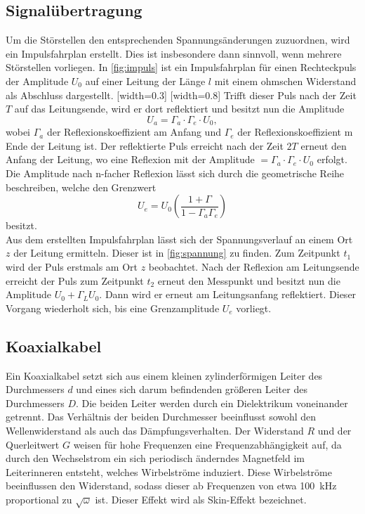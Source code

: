 \subsection{Signalübertragung}
Um die Störstellen den entsprechenden Spannungsänderungen zuzuordnen, wird ein Impulsfahrplan erstellt. Dies ist insbesondere dann sinnvoll, wenn mehrere Störstellen vorliegen. In \autoref{fig:impuls} ist ein Impulsfahrplan für einen Rechteckpuls der Amplitude $U_0$ auf einer Leitung der Länge $l$ mit einem ohmschen Widerstand als Abschluss dargestellt.
[width=0.3\textwidth]
[width=0.8\textwidth]
Trifft dieser Puls nach der Zeit $T$ auf das Leitungsende, wird er dort reflektiert und besitzt nun die Amplitude
\begin{equation}
  U_a=\Gamma_a \cdot \Gamma_e \cdot U_0,
\end{equation}
wobei $\Gamma_a$ der Reflexionskoeffizient am Anfang und $\Gamma_e$ der Reflexionskoeffizient m Ende der Leitung ist. Der reflektierte Puls erreicht nach der Zeit $2T$ erneut den Anfang der Leitung, wo eine Reflexion mit der Amplitude $=\Gamma_a \cdot \Gamma_e \cdot U_0$ erfolgt. Die Amplitude nach n-facher Reflexion lässt sich durch die geometrische Reihe beschreiben, welche den Grenzwert
\begin{equation}
  U_e=U_0\left(\frac{1+\Gamma}{1-\Gamma_a \Gamma_e}\right)
\end{equation}
besitzt.\\
Aus dem erstellten Impulsfahrplan lässt sich der Spannungsverlauf an einem Ort $z$ der Leitung ermitteln. Dieser ist in \autoref{fig:spannung} zu finden. Zum Zeitpunkt $t_1$ wird der Puls erstmals am Ort $z$ beobachtet. Nach der Reflexion am Leitungsende erreicht der Puls zum Zeitpunkt $t_2$ erneut den Messpunkt und besitzt nun die Amplitude $U_0 +\Gamma_L U_0$. Dann wird er erneut am Leitungsanfang reflektiert. Dieser Vorgang wiederholt sich, bis eine Grenzamplitude $U_e$ vorliegt.

\subsection{Koaxialkabel}
Ein Koaxialkabel setzt sich aus einem kleinen zylinderförmigen Leiter des Durchmessers $d$ und eines sich darum befindenden größeren Leiter des Durchmessers $D$. Die beiden Leiter werden durch ein Dielektrikum voneinander getrennt. Das Verhältnis der beiden Durchmesser beeinflusst sowohl den Wellenwiderstand als auch das Dämpfungsverhalten. Der Widerstand $R$ und der Querleitwert $G$ weisen für hohe Frequenzen eine Frequenzabhängigkeit auf, da durch den Wechselstrom ein sich periodisch änderndes Magnetfeld im Leiterinneren entsteht, welches Wirbelströme induziert. Diese Wirbelströme beeinflussen den Widerstand, sodass dieser ab Frequenzen von etwa \SI{100}{\kilo\hertz} proportional zu $\sqrt{\omega}$ ist. Dieser Effekt wird als Skin-Effekt bezeichnet.

